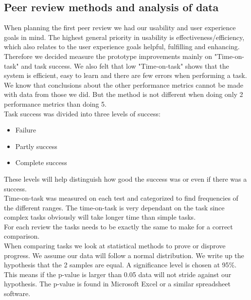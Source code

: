 \subsection{Peer review methods and analysis of data}
When planning the first peer review we had our usability and user experience goals in mind. The highest general priority in usability is effectiveness/efficiency, which also relates to the user experience goals helpful, fulfilling and enhancing. Therefore we decided measure the prototype improvements mainly on "Time-on-task" and task success. We also felt that low "Time-on-task" shows that the system is efficient, easy to learn and there are few errors when performing a task. We know that conclusions about the other performance metrics cannot be made with data from those we did. But the method is not different when doing only 2 performance metrics than doing 5.\\
Task success was divided into three levels of success:
\begin{itemize}
\item Failure
\item Partly success
\item Complete success
\end{itemize}
These levels will help distinguish how good the success was or even if there was a success.\\
Time-on-task was measured on each test and categorized to find frequencies of the different ranges. The time-on-task is very dependant on the task since complex tasks obviously will take longer time than simple tasks.\\
For each review the tasks needs to be exactly the same to make for a correct comparison.\\

When comparing tasks we look at statistical methods to prove or disprove progress. We assume our data will follow a normal distribution. We write up the hypothesis that the 2 samples are equal. A significance level is chosen at 95\%. This means if the p-value is larger than 0.05 data will not stride against our hypothesis. The p-value is found in Microsoft Excel or a similar spreadsheet software. \\


